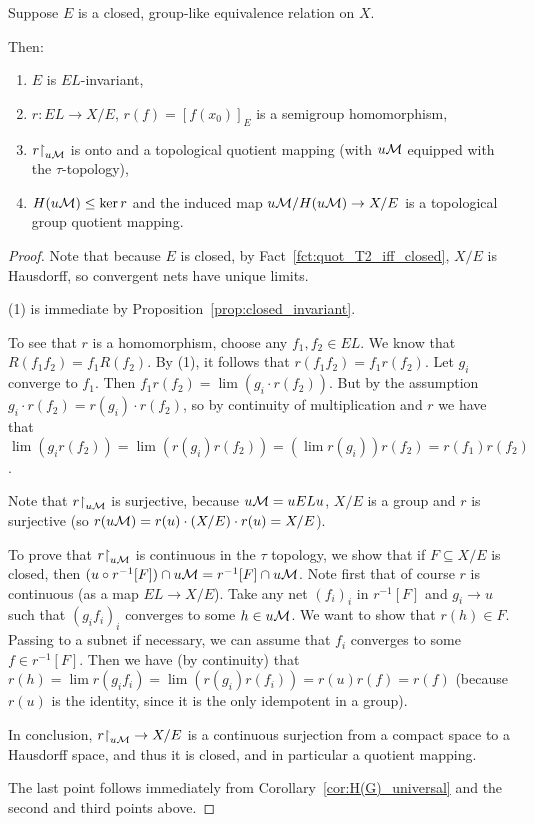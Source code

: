 	\begin{lem}
		\label{lem:closed_group_like}
		Suppose $E$ is a closed, group-like equivalence relation on $X$.
		
		Then:
		\begin{enumerate}
			\item
			$E$ is $EL$-invariant,
			\item
			$r\colon EL\to X/E$, $r(f)=[f(x_0)]_E$ is a semigroup homomorphism,
			\item
			$r\mathord{\upharpoonright}_{u{\mathcal M}}$ is onto and a topological quotient mapping (with $u{\mathcal M}$ equipped with the $\tau$-topology),
			\item
			$H(u{\mathcal M})\leq \ker r$ and the induced map $u{\mathcal M}/H(u{\mathcal M})\to X/E$ is a topological group quotient mapping.
		\end{enumerate}
	\end{lem}
	\begin{proof}
		Note that because $E$ is closed, by Fact~\ref{fct:quot_T2_iff_closed}, $X/E$ is Hausdorff, so convergent nets have unique limits.
		
		(1) is immediate by Proposition~\ref{prop:closed_invariant}.
		
		To see that $r$ is a homomorphism, choose any $f_1,f_2\in EL$. We know that $R(f_1f_2)=f_1R(f_2)$. By (1), it follows that $r(f_1f_2)=f_1r(f_2)$. Let $g_i$ converge to $f_1$. Then $f_1r(f_2)=\lim (g_i\cdot r(f_2))$. But by the assumption $g_i\cdot r(f_2)=r(g_i)\cdot r(f_2)$, so by continuity of multiplication and $r$ we have that $\lim(g_ir(f_2))=\lim(r(g_i)r(f_2))=(\lim r(g_i))r(f_2)=r(f_1)r(f_2)$.
		
		Note that $r\mathord{\upharpoonright}_{u{\mathcal M}}$ is surjective, because $u{\mathcal M}=uELu$, $X/E$ is a group and $r$ is surjective (so $r(u{\mathcal M})=r(u)\cdot (X/E)\cdot r(u)=X/E$).
		
		To prove that $r\mathord{\upharpoonright}_{u{\mathcal M}}$ is continuous in the $\tau$ topology, we show that if $F\subseteq X/E$ is closed, then $(u\circ r^{-1}[F])\cap u{\mathcal M}=r^{-1}[F]\cap u{\mathcal M}$. Note first that of course $r$ is continuous (as a map $EL\to X/E$). Take any net $(f_i)_i$ in $r^{-1}[F]$ and $g_i\to u$ such that $(g_if_i)_i$ converges to some $h\in u{\mathcal M}$. We want to show that $r(h)\in F$. Passing to a subnet if necessary, we can assume that $f_i$ converges to some $f\in r^{-1}[F]$. Then we have (by continuity) that $r(h)=\lim r(g_if_i)=\lim (r(g_i)r(f_i))=r(u)r(f)=r(f)$ (because $r(u)$ is the identity, since it is the only idempotent in a group).
		
		In conclusion, $r\mathord{\upharpoonright}_{u{\mathcal M}}\to X/E$ is a continuous surjection from a compact space to a Hausdorff space, and thus it is closed, and in particular a quotient mapping.
		
		The last point follows immediately from Corollary~\ref{cor:H(G)_universal} and the second and third points above.
	\end{proof}
	
